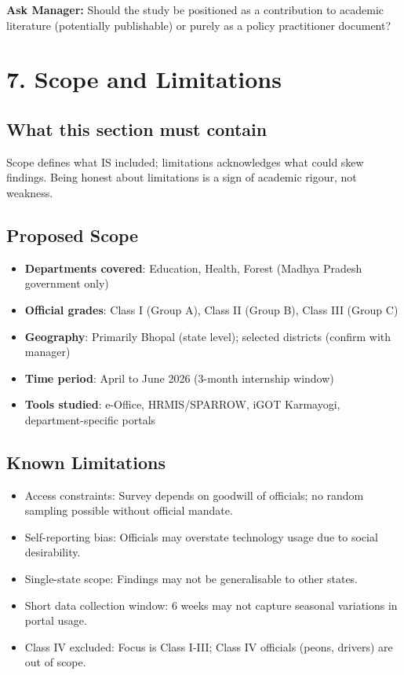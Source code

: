 \documentclass[12pt,a4paper]{article}
\newcommand{\managerQ}[1]{%
  \begin{tcolorbox}[colback=govgold!10,colframe=govgold,boxrule=0.5pt,arc=2mm,
    left=4pt,right=4pt,top=2pt,bottom=2pt]
    \small\textbf{Ask Manager:} #1
  \end{tcolorbox}
}
\begin{document}
\managerQ{Should the study be positioned as a contribution to academic literature (potentially publishable) or purely as a policy practitioner document?}

\vspace{0.4cm}

\section{7. Scope and Limitations}

\subsection{What this section must contain}
Scope defines what IS included; limitations acknowledges what could skew findings. Being honest about limitations is a sign of academic rigour, not weakness.

\subsection{Proposed Scope}
\begin{itemize}[leftmargin=1.5em]
  \item \textbf{Departments covered}: Education, Health, Forest (Madhya Pradesh government only)
  \item \textbf{Official grades}: Class I (Group A), Class II (Group B), Class III (Group C)
  \item \textbf{Geography}: Primarily Bhopal (state level); selected districts (confirm with manager)
  \item \textbf{Time period}: April to June 2026 (3-month internship window)
  \item \textbf{Tools studied}: e-Office, HRMIS/SPARROW, iGOT Karmayogi, department-specific portals
\end{itemize}

\subsection{Known Limitations}
\begin{itemize}[leftmargin=1.5em]
  \item Access constraints: Survey depends on goodwill of officials; no random sampling possible without official mandate.
  \item Self-reporting bias: Officials may overstate technology usage due to social desirability.
  \item Single-state scope: Findings may not be generalisable to other states.
  \item Short data collection window: 6 weeks may not capture seasonal variations in portal usage.
  \item Class IV excluded: Focus is Class I-III; Class IV officials (peons, drivers) are out of scope.
\end{itemize}
\end{document}
